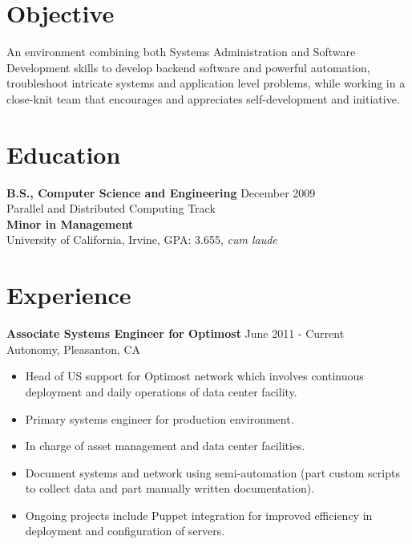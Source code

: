 \documentclass[10pt,line,margin,letterpaper]{res}
\begin{document}
\address{4245 Stanley Blvd. Apt. 6, Pleasanton, CA}
\address{aaron.peschel@gmail.com or (760)-791-7301}

\begin{resume}
\pagestyle{empty}
\section{Objective}
An environment combining both Systems Administration and Software Development skills to develop backend software and powerful automation, troubleshoot intricate systems and application level problems, while working in a close-knit team that encourages and appreciates self-development and initiative.

\section{Education}
    {\bf B.S., Computer Science and Engineering} \hfill December 2009 \\
    Parallel and Distributed Computing Track \\
    {\bf Minor in Management} \\
    University of California, Irvine, GPA: 3.655, \textit{cum laude}

\section{Experience}
    {\bf Associate Systems Engineer for Optimost} \hfill June 2011 - Current\\
    Autonomy, Pleasanton, CA
    \begin{itemize} \itemsep -2pt
    \item Head of US support for Optimost network which involves continuous deployment and daily operations of data center facility.
    \item Primary systems engineer for production environment.
    \item In charge of asset management and data center facilities.
    \item Document systems and network using semi-automation (part custom scripts to collect data and part manually written documentation).
    \item Ongoing projects include Puppet integration for improved efficiency in deployment and configuration of servers.
    \end{itemize}


\end{resume}
\end{document}
